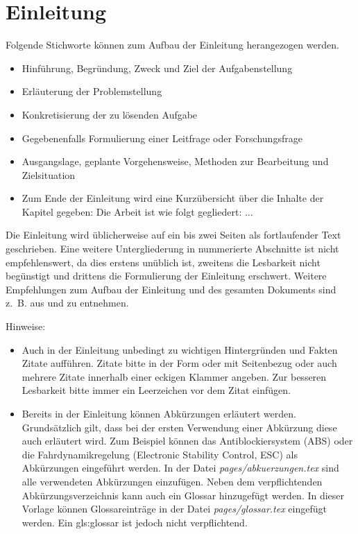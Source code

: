 \chapter{Einleitung}
\label{cha:Einleitung}

Folgende Stichworte können zum Aufbau der Einleitung herangezogen werden.

\begin{itemize}
\item Hinführung, Begründung, Zweck und Ziel der Aufgabenstellung
\item Erläuterung der Problemstellung
\item Konkretisierung der zu lösenden Aufgabe
\item Gegebenenfalls Formulierung einer Leitfrage oder Forschungsfrage
\item Ausgangslage, geplante Vorgehensweise, Methoden zur Bearbeitung und Zielsituation
\item Zum Ende der Einleitung wird eine Kurzübersicht über die Inhalte der Kapitel gegeben: \glqq Die Arbeit ist wie folgt gegliedert: ...\grqq
\end{itemize}

Die Einleitung wird üblicherweise auf ein bis zwei Seiten als fortlaufender Text geschrieben. Eine weitere Untergliederung in nummerierte Abschnitte ist nicht empfehlenswert, da dies erstens unüblich ist, zweitens die Lesbarkeit nicht begünstigt und drittens die Formulierung der Einleitung erschwert. Weitere Empfehlungen zum Aufbau der Einleitung und des gesamten Dokuments sind z.~B. aus \autocite{DHBW.2021} und \autocite{Lindenlauf.2022} zu entnehmen.

\clearpage

Hinweise: 

\begin{itemize}
\item Auch in der Einleitung unbedingt zu wichtigen Hintergründen und Fakten Zitate aufführen. Zitate bitte in der Form \autocite{Tipler.2019} oder mit Seitenbezug \autocite[66]{Ziegler.2017} oder auch mehrere Zitate  \autocite{Tipler.2019, Ziegler.2017} innerhalb einer eckigen Klammer angeben. Zur besseren Lesbarkeit bitte immer ein Leerzeichen vor dem Zitat einfügen.
	
\item Bereits in der Einleitung können Abkürzungen erläutert werden. Grundsätzlich gilt, dass bei der ersten Verwendung einer Abkürzung diese auch erläutert wird. Zum Beispiel können das Antiblockiersystem (ABS) oder die Fahrdynamikregelung (Electronic Stability Control, ESC) als Abkürzungen eingeführt werden. In der Datei \textit{pages/abkuerzungen.tex} sind alle verwendeten Abkürzungen einzufügen. Neben dem verpflichtenden Abkürzungsverzeichnis kann auch ein Glossar hinzugefügt werden. In dieser Vorlage können Glossareinträge in der Datei \textit{pages/glossar.tex} eingefügt werden. Ein \Gls{gls:glossar} ist jedoch nicht verpflichtend.
\end{itemize}